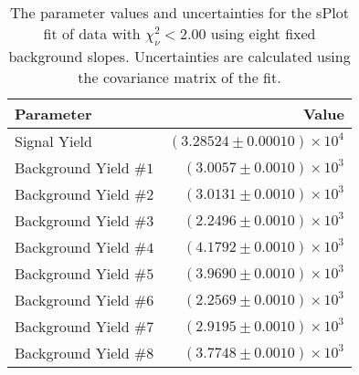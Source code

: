 
\begin{table}[ht]
    \begin{center}
        \begin{tabular}{lr}\toprule
            Parameter & Value \\\midrule
            Signal Yield & $(3.28524 \pm 0.00010) \times 10^{4}$ \\
            Background Yield $\#1$ & $(3.0057 \pm 0.0010) \times 10^{3}$ \\
            Background Yield $\#2$ & $(3.0131 \pm 0.0010) \times 10^{3}$ \\
            Background Yield $\#3$ & $(2.2496 \pm 0.0010) \times 10^{3}$ \\
            Background Yield $\#4$ & $(4.1792 \pm 0.0010) \times 10^{3}$ \\
            Background Yield $\#5$ & $(3.9690 \pm 0.0010) \times 10^{3}$ \\
            Background Yield $\#6$ & $(2.2569 \pm 0.0010) \times 10^{3}$ \\
            Background Yield $\#7$ & $(2.9195 \pm 0.0010) \times 10^{3}$ \\
            Background Yield $\#8$ & $(3.7748 \pm 0.0010) \times 10^{3}$ \\\bottomrule
        \end{tabular}
        \caption{The parameter values and uncertainties for the sPlot fit of data with $\chi^2_\nu < 2.00$ using eight fixed background slopes. Uncertainties are calculated using the covariance matrix of the fit.}\label{tab:splot-fit-results-chisqdof-2.00-fixed-8}
    \end{center}
\end{table}
